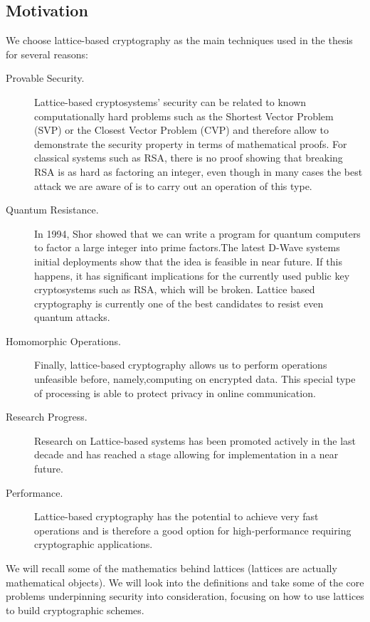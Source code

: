 \subsection{Motivation}
\label{ssub:The motivations}
We choose lattice-based cryptography as the main techniques used in the
thesis for several reasons:
\begin{description}
\item[Provable Security.] Lattice-based cryptosystems' security can be related
  to known computationally hard problems such as the Shortest Vector Problem (SVP)
  or the Closest Vector Problem (CVP) and therefore allow to demonstrate the security
  property in terms of mathematical proofs. For classical systems such as RSA,
  there is no proof showing that breaking RSA is as hard as factoring an integer,
  even though in many cases the best attack we are aware of is to carry out an operation of this type.
\item[Quantum Resistance.] In 1994, Shor \cite{shor1994algorithms} showed that
  we can write a program for quantum computers to factor a large integer
  into prime factors.The latest D-Wave systems initial deployments show that the
  idea is feasible in near future. If this happens, it has significant
  implications for the currently used public key cryptosystems such as RSA, which
  will be broken. Lattice based cryptography is currently one of the best
  candidates to resist even quantum attacks.
\item[Homomorphic Operations.] Finally, lattice-based cryptography allows us to
  perform operations unfeasible before, namely,computing on encrypted data. This
  special type of processing is able to protect privacy in online
  communication.
\item[Research Progress.] Research on Lattice-based systems has been promoted actively
  in the last decade and has reached a stage allowing for
  implementation in a near future.
\item[Performance.] Lattice-based cryptography has the potential to achieve very
  fast operations and is therefore a good option for high-performance requiring
  cryptographic applications.
\end{description}
We will recall some of the mathematics behind lattices (lattices are actually
mathematical objects). We will look into the definitions and take some of the core
problems underpinning security into consideration, focusing on how to use lattices to build
cryptographic schemes.



